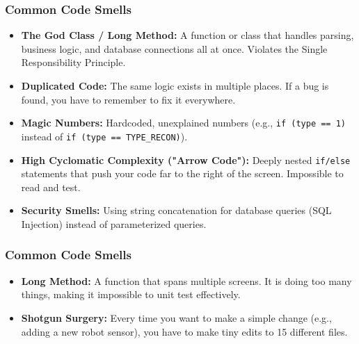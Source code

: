 \documentclass[xcolor=table]{beamer}
\begin{document}
\begin{frame}
    \frametitle{Common Code Smells}
    \begin{itemize}
        \item \textbf{The God Class / Long Method:} A function or class that handles parsing, business logic, and database connections all at once. Violates the Single Responsibility Principle.
        \item \textbf{Duplicated Code:} The same logic exists in multiple places. If a bug is found, you have to remember to fix it everywhere.
        \item \textbf{Magic Numbers:} Hardcoded, unexplained numbers (e.g., \texttt{if (type == 1)} instead of \texttt{if (type == TYPE\_RECON)}).
        \item \textbf{High Cyclomatic Complexity ("Arrow Code"):} Deeply nested \texttt{if/else} statements that push your code far to the right of the screen. Impossible to read and test.
        \item \textbf{Security Smells:} Using string concatenation for database queries (SQL Injection) instead of parameterized queries.
    \end{itemize}
\end{frame}

\begin{frame}
    \frametitle{Common Code Smells}
    \begin{itemize}
        \item \textbf{Long Method:} A function that spans multiple screens. It is doing too many things, making it impossible to unit test effectively.
        \item \textbf{Shotgun Surgery:} Every time you want to make a simple change (e.g., adding a new robot sensor), you have to make tiny edits to 15 different files.
    \end{itemize}
\end{frame}
\end{document}
